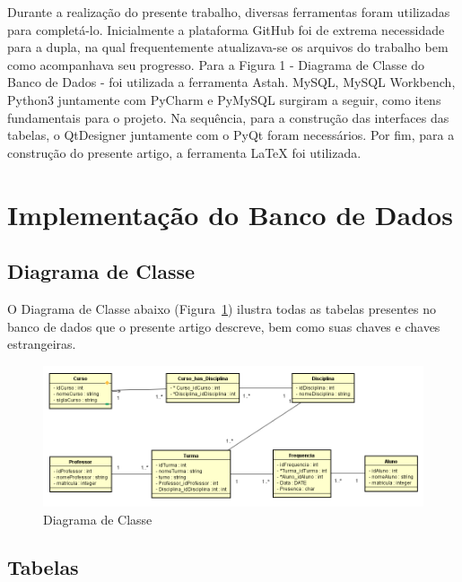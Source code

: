 \documentclass[12pt]{article}
\begin{document}
Durante a realização do presente trabalho, diversas ferramentas foram utilizadas para completá-lo. Inicialmente a plataforma GitHub\cite{jviriato:2017} foi de extrema necessidade para a dupla, na qual frequentemente atualizava-se os arquivos do trabalho bem como acompanhava seu progresso. Para a Figura 1 - Diagrama de Classe do Banco de Dados - foi utilizada a ferramenta Astah\cite{astah}. MySQL, MySQL Workbench\cite{mysqlworkbench}, Python3\cite{python3} juntamente com PyCharm\cite{pycharm} e PyMySQL surgiram a seguir, como itens fundamentais para o projeto. Na sequência, para a construção das interfaces das tabelas, o QtDesigner\cite{qt} juntamente com o PyQt foram necessários. Por fim, para a construção do presente artigo, a ferramenta LaTeX\cite{latex} foi utilizada.



\section{Implementação do Banco de Dados}\label{sec:impbd}

\subsection{Diagrama de Classe}

O Diagrama de Classe abaixo (Figura~\ref{fig:exampleFig1}) ilustra todas as tabelas presentes no banco de dados que o presente artigo descreve, bem como suas chaves e chaves estrangeiras.
\begin{figure}[ht]
\centering
\includegraphics[width=1\textwidth]{Pic01.png}
\caption{Diagrama de Classe}
\label{fig:exampleFig1}
\end{figure}
\clearpage 

\subsection{Tabelas}
\end{document}
